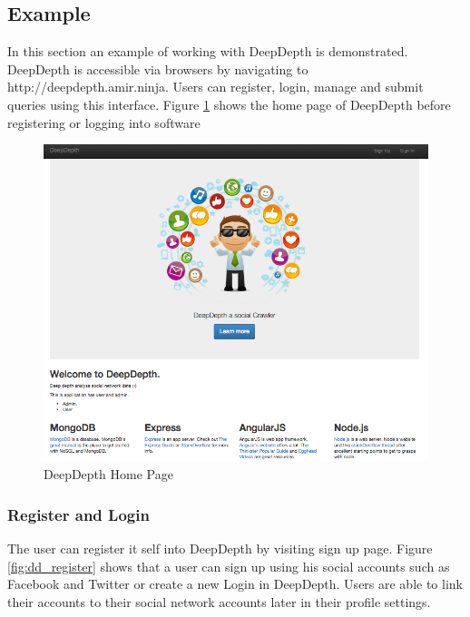 \documentclass[a4paper,11pt]{report}
\begin{document}
\subsection{Example}

In this section an example of working with DeepDepth is demonstrated. DeepDepth is accessible via browsers by navigating to http://deepdepth.amir.ninja. Users can register, login, manage and submit queries using this interface. Figure \ref{fig:dd_firstpage} shows the home page of DeepDepth before registering or logging into software

\begin{figure}[H!]
\begin{center}
\includegraphics[scale=0.5]{dd_firstpage.png}
\end{center}
\caption{DeepDepth Home Page}
\label{fig:dd_firstpage}
\end{figure}

\subsubsection{Register and Login}

The user can register it self into DeepDepth by visiting sign up page. Figure \ref{fig:dd_register} shows that a user can sign up using his social accounts such as Facebook and Twitter or create a new Login in DeepDepth. Users are able to link their accounts to their social network accounts later in their profile settings.
\end{document}
